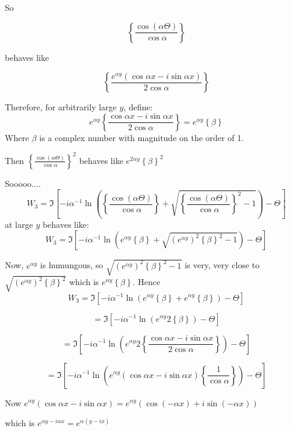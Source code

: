 \documentclass[a4paper]{report}
\begin{document}
\parbox{0.5 cm}{So}
\parbox{2 cm}{ \[ \left\{ \frac{\cos(\alpha \Theta)}{\cos \alpha} \right\} \]}
\parbox{2 cm}{behaves like}
\parbox{3 cm}{\[ \left\{ \frac{e^{\alpha y}(\cos \alpha x - i \sin \alpha x)}{2 \cos \alpha} \right\} \]}

Therefore, for arbitrarily large $y$, define:
\[ e^{\alpha y} \left\{ \frac{\cos \alpha x - i \sin \alpha x }{2 \cos \alpha} \right\} = e^{\alpha y} \left\{ \beta \right\} \] 
Where $\beta$ is a complex number with magnitude on the order of 1.


Then  $ \left\{ \frac{\cos(\alpha \Theta)}{\cos \alpha} \right\}^{2} $
behaves like $ e^{2 \alpha y} \left\{ \beta \right\}^{2} $

Sooooo....
\[ W_{3} = \Im \left[  
 - i \alpha^{-1} \ln \left(
 \left\{ \frac{\cos(\alpha \Theta)}{\cos \alpha} \right\}
 + \sqrt{\left\{ \frac{\cos(\alpha \Theta)}{\cos \alpha} \right\}^{2} - 1} \right) 
  - \Theta  \right] \]
  at large $y$ behaves like:
  \[ W_{3} = \Im \left[  
 - i \alpha^{-1} \ln \left(
  e^{\alpha y} \left\{ \beta \right\}
 + \sqrt{ (e^{\alpha y})^{2} \left\{ \beta \right\}^{2} - 1} \right) 
  - \Theta  \right] \]

Now, $e^{\alpha y}$ is humungous, so $\sqrt{ (e^{\alpha y})^{2} \left\{ \beta \right\}^{2} - 1}$ is very, very close to $\sqrt{ (e^{\alpha y})^{2} \left\{ \beta \right\}^{2}}$ which is $e^{\alpha y} \left\{ \beta \right\}$. Hence
\[ W_{3} = \Im \left[  
 - i \alpha^{-1} \ln \left(
  e^{\alpha y} \left\{ \beta \right\}
 + e^{\alpha y} \left\{ \beta \right\} \right) 
  - \Theta  \right] \]
  
\[ = \Im \left[  
 - i \alpha^{-1} \ln \left(
  e^{\alpha y} 2 \left\{ \beta \right\} \right) 
  - \Theta  \right] \]
  
  \[ = \Im \left[  
 - i \alpha^{-1} \ln \left(
  e^{\alpha y} 2 \left\{ \frac{\cos \alpha x - i \sin \alpha x }{2 \cos \alpha} \right\} \right) 
  - \Theta  \right] \]

\[ = \Im \left[  
 - i \alpha^{-1} \ln \left(
  e^{\alpha y}( \cos \alpha x - i \sin \alpha x  )  \left\{ \frac{1}{\cos \alpha} \right\} \right) 
  - \Theta  \right] \]

Now $ e^{\alpha y}( \cos \alpha x - i \sin \alpha x  ) = 
e^{\alpha y}( \cos(- \alpha x) + i \sin(- \alpha x)  )$ 

which is $e^{\alpha y - i \alpha x} = e^{ \alpha (y - ix)}$
\end{document}
